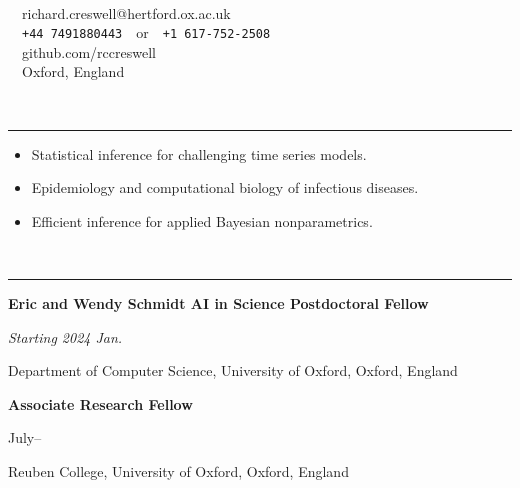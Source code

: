 \documentclass[11pt]{article}
\begin{document}
\noindent\parbox{.3\textwidth}{\LARGE \textbf{}}
\parbox{.3\textwidth}{~}
\parbox{.4\textwidth}{
\-\hspace{0cm}{\faEnvelopeO}~~richard.creswell@hertford.ox.ac.uk\\
\-\hspace{0cm}{\faWhatsapp}~~\texttt{\footnotesize +44 7491880443}~~or~~\texttt{\footnotesize +1 617-752-2508}\\
\-\hspace{0cm}{\faGithub}~~github.com/rccreswell\\
{ \faHome}~~Oxford, England
}

\vspace{0.6cm}

\vspace{-2.75mm} \\
\rule{\textwidth}{0.4pt}
\vspace{-7mm}
\begin{itemize}[leftmargin=*]
\setlength{\itemsep}{2pt}
\setlength{\parskip}{0pt}
\setlength{\parsep}{0pt}
\item Statistical inference for challenging time series models.
\item Epidemiology and computational biology of infectious diseases.
\item Efficient inference for applied Bayesian nonparametrics.
\end{itemize}

 

\vspace{0.4cm}




\vspace{-2.75mm} \\
\rule{\textwidth}{0.4pt}
\vspace{0.1mm}
\noindent\parbox{.65\textwidth}{\raggedright  \textbf{Eric and Wendy Schmidt AI in Science Postdoctoral Fellow}}
\parbox{.35\textwidth}{\raggedleft \emph{Starting 2024 Jan.}}
Department of Computer Science, University of Oxford, Oxford, England
\vspace{0.4cm}

\noindent\parbox{.65\textwidth}{\raggedright  \textbf{Associate Research Fellow}}
\parbox{.35\textwidth}{ July--}
Reuben College, University of Oxford, Oxford, England

\vspace{0.4cm}
\end{document}
